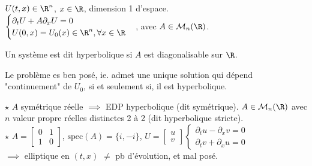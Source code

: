 \documentclass[12pt,a4paper]{article}
\begin{document}
	$U(t,x) \in \R^n$, $x \in \R$, dimension 1 d'espace.\\
	$\begin{cases}
		\partial_t U + A \partial_x U = 0\\
		U(0,x) = U_0(x) \in \R^n, \forall x \in \R
	\end{cases}$, avec $A \in \mathcal M_n(\R)$.\\
	
	\begin{defi}
		\begin{minipage}[t]{15cm}
			Un système est dit hyperbolique si $A$ est diagonalisable sur $\R$.
		\end{minipage}
	\end{defi}
	
	\vspace{-.5cm}
	
	\begin{prop}
		\begin{minipage}[t]{15cm}
			Le problème es ben posé, ie. admet une unique solution qui dépend "continuement" de $U_0$, si et seulement si, il est hyperbolique. 
		\end{minipage}
	\end{prop}
	
	\vspace{-.5cm}
	
	\begin{ex}
		\begin{minipage}[t]{15cm}
			$\star$ $A$ symétrique réelle $ \implies$ EDP hyperbolique (dit symétrique). $A \in \mathcal M_n(\R)$ avec $n$ valeur propre réelles distinctes 2 à 2 (dit hyperbolique stricte).\\
			
			$\star$ $A = \begin{bmatrix}
				0 & 1 \\
				1 & 0
			\end{bmatrix}$, $\mathrm{spec}(A) = \{i,-i\}$, $U = \begin{bmatrix}
				u \\
				v
			\end{bmatrix}\begin{cases}
				\partial_t u -\partial_x v= 0\\
				\partial_t v + \partial_x u = 0
			\end{cases}$\\
			$\implies$  elliptique en $(t,x)$ $ \not =$ pb d'évolution, et mal posé.
		\end{minipage}
	\end{ex}
	
\end{document}
